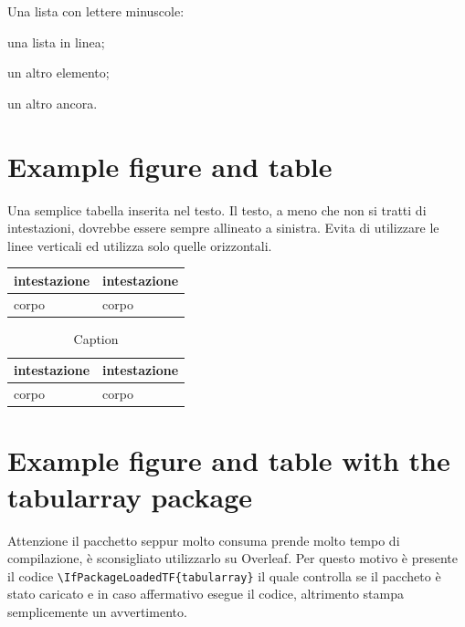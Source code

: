 Una lista con lettere minuscole:
\begin{enumerate*}[label=\alph*.]
    \item una lista in linea;
    \item un altro elemento;
    \item un altro ancora.
\end{enumerate*}

\section{Example figure and table}

Una semplice tabella inserita nel testo.
Il testo, a meno che non si tratti di intestazioni, dovrebbe essere sempre allineato a sinistra.
Evita di utilizzare le linee verticali ed utilizza solo quelle orizzontali.

\begin{tabular}{@{} l l @{}}
\toprule
    intestazione & intestazione \\
\midrule
    corpo & corpo \\
\bottomrule
\end{tabular}

\begin{table}[h]
    \centering
    \caption{Caption}\label{tab:my_label}
    \begin{tabular}{@{} *{2}{l} @{}}
    \toprule
        intestazione & intestazione \\
    \midrule
        corpo & corpo \\
    \bottomrule
    \end{tabular}
\end{table}

\section{Example figure and table with the tabularray package}

Attenzione il pacchetto  seppur molto consuma prende molto tempo di compilazione, è sconsigliato utilizzarlo su Overleaf.
Per questo motivo è presente il codice \verb|\IfPackageLoadedTF{tabularray}| il quale controlla se il paccheto è stato caricato e in caso affermativo esegue il codice, altrimento stampa semplicemente un avvertimento.

